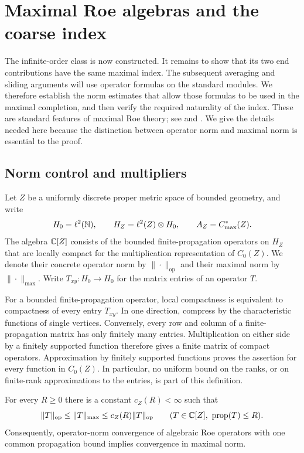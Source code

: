 \section{Maximal Roe algebras and the coarse index}
\label{sec:maximal-index}

The infinite-order class is now constructed. It remains to show that its
two end contributions have the same maximal index. The subsequent averaging
and sliding arguments will use operator
formulas on the standard modules.  We therefore establish the norm estimates
that allow those formulas to be used in the maximal completion, and then
verify the required naturality of the index.  These are standard features of
maximal Roe theory; see \cite[Section~2]{OOY09} and
\cite[Section~2]{SS21}.  We give the details needed here because the distinction
between operator norm and maximal norm is essential to the proof.

\subsection{Norm control and multipliers}

Let $Z$ be a uniformly discrete proper metric space of bounded geometry, and
write
\[
 H_0=\ell^2(\mathbb N),\qquad H_Z=\ell^2(Z)\otimes H_0,
 \qquad A_Z=C^*_{\max}(Z).
\]
The algebra $\mathbb C[Z]$ consists of the bounded finite-propagation operators on
$H_Z$ that are locally compact for the multiplication representation of
$C_0(Z)$.  We denote their concrete operator norm by $\|\cdot\|_{\mathrm{op}}$
and their maximal norm by $\|\cdot\|_{\max}$.  Write $T_{xy}:H_0\to H_0$ for
the matrix entries of an operator $T$.

For a bounded finite-propagation operator, local compactness is equivalent
to compactness of every entry $T_{xy}$.  In one direction, compress by the
characteristic functions of single vertices.  Conversely, every row and
column of a finite-propagation matrix has only finitely many entries.
Multiplication on either side by a finitely supported function therefore
gives a finite matrix of compact operators.  Approximation by finitely
supported functions proves the assertion for every function in $C_0(Z)$.
In particular, no uniform bound on the ranks, or on finite-rank
approximations to the entries, is part of this definition.

\begin{lemma}
\label{ana:fixed-propagation}
For every $R\geq 0$ there is a constant $c_Z(R)<\infty$ such that
\[
 \|T\|_{\mathrm{op}}\leq\|T\|_{\max}
 \leq c_Z(R)\|T\|_{\mathrm{op}}
 \qquad(T\in\mathbb C[Z],\ \operatorname{prop}(T)\leq R).
\]
Consequently, operator-norm convergence of algebraic Roe operators with one
common propagation bound implies convergence in maximal norm.
\end{lemma}


